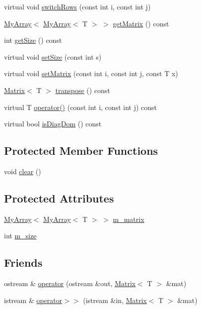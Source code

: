 \begin{DoxyCompactItemize}
\item 
virtual void \hyperlink{classMatrix_a23bb949d4b4256dd253808e35d73d4b9}{switch\+Rows} (const int i, const int j)
\item 
\hyperlink{classMyArray}{My\+Array}$<$ \hyperlink{classMyArray}{My\+Array}$<$ T $>$ $>$ \hyperlink{classMatrix_afba2ee1c4e106b78099350d070ae1e51}{get\+Matrix} () const 
\item 
int \hyperlink{classMatrix_aa5d12d49bec4b4876f1a60c54a197ed7}{get\+Size} () const 
\item 
virtual void \hyperlink{classMatrix_a1add3e066eaaa19d5056fc6e2cbc767c}{set\+Size} (const int s)
\item 
virtual void \hyperlink{classMatrix_a0cf31a462707441cbbab037190c88f33}{set\+Matrix} (const int i, const int j, const T x)
\item 
\hyperlink{classMatrix}{Matrix}$<$ T $>$ \hyperlink{classMatrix_afe686234b6fe54ab2ae7f500777ca560}{transpose} () const 
\item 
virtual T \hyperlink{classMatrix_af786e95d49ae55d42c3bd6824a64e032}{operator()} (const int i, const int j) const 
\item 
virtual bool \hyperlink{classMatrix_ab5deedc9644d1b8c6bc220dd336f0102}{is\+Diag\+Dom} () const 
\end{DoxyCompactItemize}
\subsection*{Protected Member Functions}
\begin{DoxyCompactItemize}
\item 
void \hyperlink{classMatrix_ad39022f082bfee09e24d098796e14e10}{clear} ()
\end{DoxyCompactItemize}
\subsection*{Protected Attributes}
\begin{DoxyCompactItemize}
\item 
\hyperlink{classMyArray}{My\+Array}$<$ \hyperlink{classMyArray}{My\+Array}$<$ T $>$ $>$ \hyperlink{classMatrix_a3190abe45497430b3aa006002af3cb37}{m\+\_\+matrix}
\item 
int \hyperlink{classMatrix_a1113fd527e7677a93e88d1e736450968}{m\+\_\+size}
\end{DoxyCompactItemize}
\subsection*{Friends}
\begin{DoxyCompactItemize}
\item 
ostream \& \hyperlink{classMatrix_a7a26ce88f9d928002eba0af6847a0b44}{operator} (ostream \&out, \hyperlink{classMatrix}{Matrix}$<$ T $>$ \&mat)
\item 
istream \& \hyperlink{classMatrix_a175cb81129f42ab801259469bc7cc7a0}{operator$>$$>$} (istream \&in, \hyperlink{classMatrix}{Matrix}$<$ T $>$ \&mat)
\end{DoxyCompactItemize}


